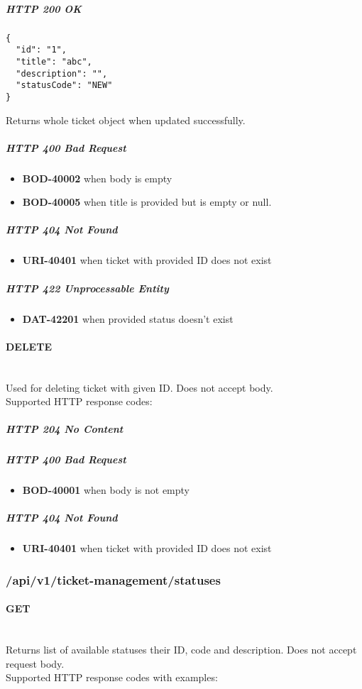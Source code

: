 \documentclass[a4paper]{article}
\newcommand{\newLineParagraph}[1]{\paragraph{#1}\mbox{}\\}
\begin{document}
    \subparagraph{HTTP 200 OK}
    \begin{verbatim}
{
  "id": "1",
  "title": "abc",
  "description": "",
  "statusCode": "NEW"
}
    \end{verbatim}
    Returns whole ticket object when updated successfully.

    \subparagraph{HTTP 400 Bad Request}
    \begin{itemize}
        \item \textbf{BOD-40002} when body is empty
        \item \textbf{BOD-40005} when title is provided but is empty or null.
    \end{itemize}

    \subparagraph{HTTP 404 Not Found}
    \begin{itemize}
        \item \textbf{URI-40401} when ticket with provided ID does not exist
    \end{itemize}

    \subparagraph{HTTP 422 Unprocessable Entity}
    \begin{itemize}
        \item \textbf{DAT-42201} when provided status doesn't exist
    \end{itemize}

    \newLineParagraph{DELETE}
    Used for deleting ticket with given ID. Does not accept body. \\
    Supported HTTP response codes:

    \subparagraph{HTTP 204 No Content}

    \subparagraph{HTTP 400 Bad Request}
    \begin{itemize}
        \item \textbf{BOD-40001} when body is not empty
    \end{itemize}

    \subparagraph{HTTP 404 Not Found}
    \begin{itemize}
        \item \textbf{URI-40401} when ticket with provided ID does not exist
    \end{itemize}

    \subsubsection{/api/v1/ticket-management/statuses}

    \newLineParagraph{GET}
    Returns list of available statuses their ID, code and description. Does not accept request body. \\
    Supported HTTP response codes with examples:
\end{document}
